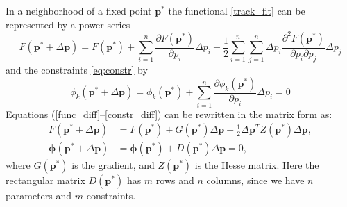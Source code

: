 
In a neighborhood of a fixed point $\boldsymbol{p}^*$ the functional \eqref{track_fit} can be represented by a power series
\begin{equation}\label{func_diff}
F(\boldsymbol{p}^*+\Delta\boldsymbol{p}) = F(\boldsymbol{p}^*) + \sum_{i=1}^n \frac{\partial F(\boldsymbol{p}^*)}{\partial p_i} \Delta p_i + \frac{1}{2}\sum_{i=1}^n\sum_{j=1}^n \Delta p_i \frac{\partial^2 F(\boldsymbol{p}^*)}{\partial p_i \partial p_j} \Delta p_j
\end{equation}
and the constraints \eqref{eq:constr} by
\begin{equation}\label{constr_diff}
\phi_k(\boldsymbol{p}^*+\Delta\boldsymbol{p}) = \phi_k(\boldsymbol{p}^*) + \sum_{i=1}^n \frac{\partial \phi_k(\boldsymbol{p}^*)}{\partial p_i}\Delta p_i = 0
\end{equation}
Equations (\ref{func_diff}--\ref{constr_diff}) can be rewritten in the matrix form as:
\begin{align}
\label{eq_diff1}
F(\boldsymbol{p}^*+\Delta\boldsymbol{p}) &= F(\boldsymbol{p}^*) + G(\boldsymbol{p}^*) \Delta\boldsymbol{p} + \frac{1}{2}\Delta\boldsymbol{p}^T Z(\boldsymbol{p}^*) \Delta\boldsymbol{p},\\
\label{eq_diff2}
\boldsymbol{\phi}(\boldsymbol{p}^*+\Delta\boldsymbol{p}) &= \boldsymbol{\phi}(\boldsymbol{p}^*) + D(\boldsymbol{p}^*) \Delta\boldsymbol{p} = 0,
\end{align}
where $G(\boldsymbol{p}^*)$ is the gradient, and $Z(\boldsymbol{p}^*)$ is the Hesse matrix.
Here the rectangular matrix $D(\boldsymbol{p}^*)$ has $m$ rows and $n$ columns, since we have $n$ parameters and $m$ constraints.

